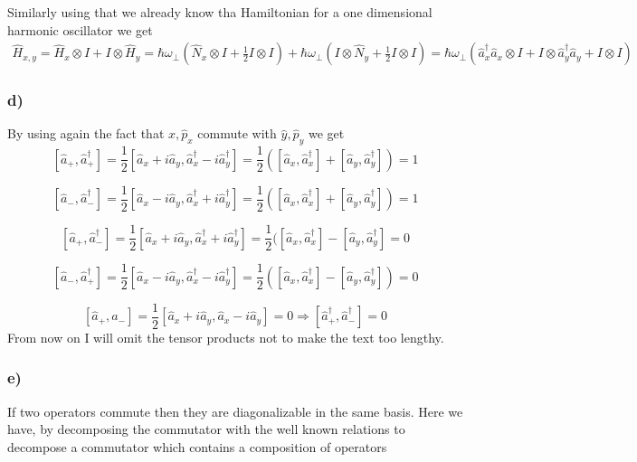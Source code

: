 \documentclass[10pt,a4paper]{book}
\begin{document}
Similarly using that we already know tha Hamiltonian for a one dimensional harmonic oscillator we get
\begin{align*}
\hat{H}_{x,y}=\hat{H}_x\otimes I+I\otimes\hat{H}_y=\hbar\omega_{\perp}(\hat{N}_x\otimes I+\frac{1}{2}I\otimes I)+\hbar\omega_{\perp}(I\otimes \hat{N}_y+\frac{1}{2} I\otimes I)=\hbar\omega_{\perp}(\hat{a}_x^{\dagger}\hat{a}_x\otimes I+I\otimes \hat{a}_y^{\dagger}\hat{a}_y +I\otimes I)
\end{align*}

\subsubsection{d)}
By using again the fact that $\hat{x},\hat{p}_x$ commute with $\hat{y},\hat{p}_y$ we get 
$$[\hat{a}_+,\hat{a}_+^{\dagger}]=\frac{1}{2}[\hat{a}_x+i\hat{a}_y,\hat{a}_x^{\dagger}-i\hat{a}^{\dagger}_y]=\frac{1}{2}([\hat{a}_x,\hat{a}_x^{\dagger}]+[\hat{a}_y,\hat{a}_y^{\dagger}])=1$$

$$[\hat{a}_-,\hat{a}_-^{\dagger}]=\frac{1}{2}[\hat{a}_x-i\hat{a}_y,\hat{a}_x^{\dagger}+i\hat{a}^{\dagger}_y]=\frac{1}{2}([\hat{a}_x,\hat{a}_x^{\dagger}]+[\hat{a}_y,\hat{a}_y^{\dagger}])=1$$


$$[\hat{a}_+,\hat{a}_-^{\dagger}]=\frac{1}{2}[\hat{a}_x+i\hat{a}_y,\hat{a}_x^{\dagger}+i\hat{a}^{\dagger}_y]=\frac{1}{2}([\hat{a}_x,\hat{a}_x^{\dagger}]-[\hat{a}_y,\hat{a}_y^{\dagger}]=0$$

$$[\hat{a}_-,\hat{a}_+^{\dagger}]=\frac{1}{2}[\hat{a}_x-i\hat{a}_y,\hat{a}_x^{\dagger}-i\hat{a}^{\dagger}_y]=\frac{1}{2}([\hat{a}_x,\hat{a}_x^{\dagger}]-[\hat{a}_y,\hat{a}_y^{\dagger}])=0$$

$$[\hat{a}_+,\hat{a}_-]=\frac{1}{2}[\hat{a}_x+i\hat{a}_y,\hat{a}_x-i\hat{a}_y]=0\Rightarrow [\hat{a}_+^{\dagger},\hat{a}_-^{\dagger}]=0$$
From now on I will omit the tensor products not to make the text too lengthy.

\subsubsection*{e)}
If two operators commute then they are diagonalizable in the same basis. Here we have, by decomposing the commutator with the well known relations to decompose a commutator which contains a  composition of operators
\end{document}
